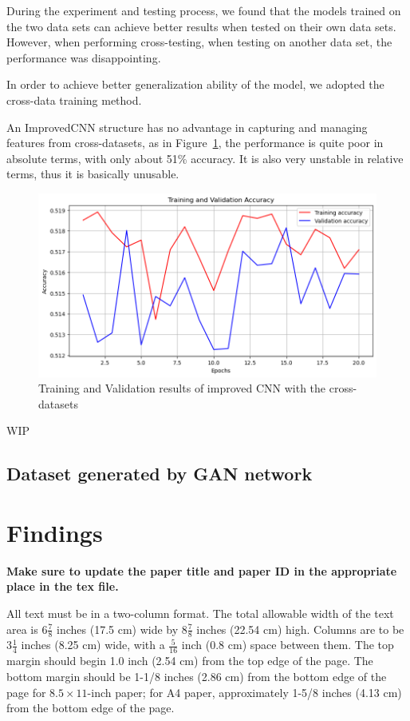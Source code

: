 \documentclass[final]{cvpr}
\begin{document}
During the experiment and testing process, we found that the models trained on the two data sets can achieve better results when tested on their own data sets. However, when performing cross-testing, when testing on another data set, the performance was disappointing.

In order to achieve better generalization ability of the model, we adopted the cross-data training method.

An ImprovedCNN structure has no advantage in capturing and managing features from cross-datasets, as in Figure~\ref*{fig:ex-cd-improvedcnn-results}, the performance is quite poor in absolute terms, with only about 51\% accuracy. It is also very unstable in relative terms, thus it is basically unusable.

\begin{figure}[t]
   \centering
   \includegraphics[width=0.9\linewidth]{img/ex-cd-improvedcnn-accuracy-results.png}
   \caption{Training and Validation results of improved CNN with the cross-datasets}
   \label{fig:ex-cd-improvedcnn-results}
\end{figure}

WIP

\subsection{Dataset generated by GAN network}

\section{Findings}

{\bf Make sure to update the paper title and paper ID in the appropriate place in the tex file.}

All text must be in a two-column format. The total allowable width of the text
area is $6\frac78$ inches (17.5 cm) wide by $8\frac78$ inches (22.54 cm) high.
Columns are to be $3\frac14$ inches (8.25 cm) wide, with a $\frac{5}{16}$ inch
(0.8 cm) space between them. The top margin should begin
1.0 inch (2.54 cm) from the top edge of the page.  The bottom margin should be
1-1/8 inches (2.86 cm) from the bottom edge of the page for $8.5 \times
11$-inch paper; for A4 paper, approximately 1-5/8 inches (4.13 cm) from the
bottom edge of the page.
\end{document}
